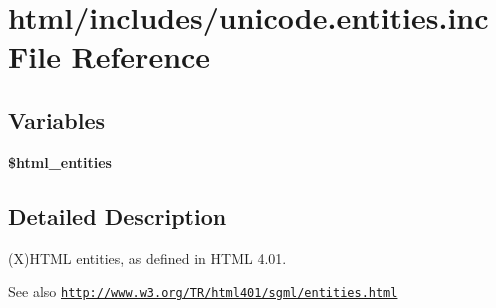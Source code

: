 \hypertarget{unicode_8entities_8inc}{
\section{html/includes/unicode.entities.inc File Reference}
\label{unicode_8entities_8inc}
}
\subsection*{Variables}
\begin{DoxyCompactItemize}
\item 
\hypertarget{unicode_8entities_8inc_a18d9cb56b3fa011cd81952f8827059cf}{
{\bfseries \$html\_\-entities}}
\label{unicode_8entities_8inc_a18d9cb56b3fa011cd81952f8827059cf}

\end{DoxyCompactItemize}


\subsection{Detailed Description}
(X)HTML entities, as defined in HTML 4.01.

\begin{DoxySeeAlso}{See also}
\href{http://www.w3.org/TR/html401/sgml/entities.html}{\tt http://www.w3.org/TR/html401/sgml/entities.html} 
\end{DoxySeeAlso}

